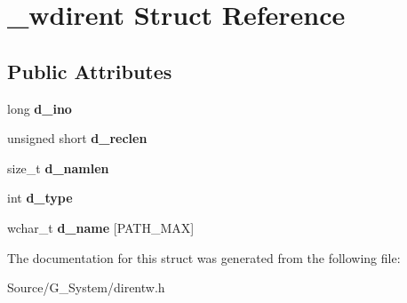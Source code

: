 \hypertarget{struct__wdirent}{}\section{\+\_\+wdirent Struct Reference}
\label{struct__wdirent}
\subsection*{Public Attributes}
\begin{DoxyCompactItemize}
\item 
long {\bfseries d\+\_\+ino}\hypertarget{struct__wdirent_ac8cfaf294a0b6a49287d3f384c280c93}{}\label{struct__wdirent_ac8cfaf294a0b6a49287d3f384c280c93}

\item 
unsigned short {\bfseries d\+\_\+reclen}\hypertarget{struct__wdirent_aff7f360608e576cd18cf11f2caf13ef3}{}\label{struct__wdirent_aff7f360608e576cd18cf11f2caf13ef3}

\item 
size\+\_\+t {\bfseries d\+\_\+namlen}\hypertarget{struct__wdirent_a0050d6131e6fa90206903e216b38799e}{}\label{struct__wdirent_a0050d6131e6fa90206903e216b38799e}

\item 
int {\bfseries d\+\_\+type}\hypertarget{struct__wdirent_a3c3874604ffccbeeaffd96709763cc3b}{}\label{struct__wdirent_a3c3874604ffccbeeaffd96709763cc3b}

\item 
wchar\+\_\+t {\bfseries d\+\_\+name} \mbox{[}P\+A\+T\+H\+\_\+\+M\+AX\mbox{]}\hypertarget{struct__wdirent_a267f915cd36cad5969337a9192cab567}{}\label{struct__wdirent_a267f915cd36cad5969337a9192cab567}

\end{DoxyCompactItemize}


The documentation for this struct was generated from the following file\+:\begin{DoxyCompactItemize}
\item 
Source/\+G\+\_\+\+System/direntw.\+h\end{DoxyCompactItemize}

